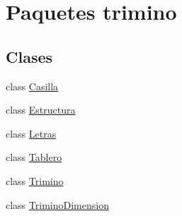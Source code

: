 \hypertarget{namespacetrimino}{}\section{Paquetes trimino}
\label{namespacetrimino}
\subsection*{Clases}
\begin{DoxyCompactItemize}
\item 
class \mbox{\hyperlink{classtrimino_1_1Casilla}{Casilla}}
\item 
class \mbox{\hyperlink{classtrimino_1_1Estructura}{Estructura}}
\item 
class \mbox{\hyperlink{classtrimino_1_1Letras}{Letras}}
\item 
class \mbox{\hyperlink{classtrimino_1_1Tablero}{Tablero}}
\item 
class \mbox{\hyperlink{classtrimino_1_1Trimino}{Trimino}}
\item 
class \mbox{\hyperlink{classtrimino_1_1TriminoDimension}{Trimino\+Dimension}}
\end{DoxyCompactItemize}
